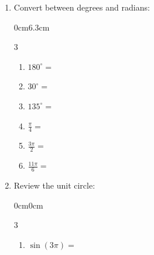 \documentclass[letterpaper,11pt]{article}
\newif\ifsolutions
\begin{document}


\begin{enumerate}
\item  Convert between degrees and radians:


\begin{changemargin}{0cm}{6.3cm}
\begin{multicols}{3}
\begin{enumerate}

\item[(a)] $180^{\circ}=$
\ifsolutions \textcolor{blue}{$\pi$} \fi
\vspace{.25in}

\item[(d)] $30^{\circ}=$
\ifsolutions \textcolor{blue}{$\displaystyle \frac{\pi}{6}$} \fi
\vspace{.25in}

\item[(b)] $135^{\circ}=$
\ifsolutions \textcolor{blue}{$\displaystyle \frac{3\pi}{4}$} \fi
\vspace{.25in}

\item[(e)] $\displaystyle \frac{\pi}{4}=$
\ifsolutions \textcolor{blue}{$45^{\circ}$} \fi
\vspace{.25in}

\item[(c)] $\displaystyle \frac{3\pi}{2}=$
\ifsolutions \textcolor{blue}{$270^{\circ}$} \fi
\vspace{.25in}

\item[(f)] $\displaystyle \frac{11\pi}{6}=$
\ifsolutions \textcolor{blue}{$330^{\circ}$} \fi
\vspace{.25in}

\end{enumerate}
\end{multicols}
\end{changemargin}


\item  Review the unit circle:
\begin{changemargin}{0cm}{0cm}
\begin{multicols}{3}

\begin{enumerate}

\item[(a)] $\displaystyle \sin{(3\pi)}=$
\ifsolutions \textcolor{blue}{$0$} \fi
\vspace{.25in}


\end{enumerate}
\end{multicols}
\end{changemargin}
\end{enumerate}
\end{document}
